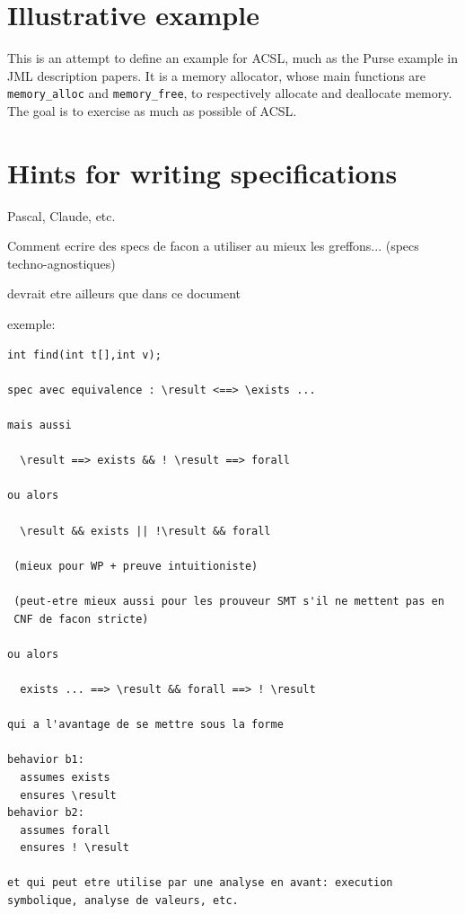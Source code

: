 \documentclass[a4paper,11pt,twoside,openright]{report}
\begin{document}






\section{Illustrative example}

This is an attempt to define an example for ACSL, much as the Purse
example in JML description papers.  It is a memory allocator, whose
main functions are \verb|memory_alloc| and \verb|memory_free|, to
respectively allocate and deallocate memory.  The goal is to exercise
as much as possible of ACSL.



\section{Hints for writing specifications}

\begin{remark}{Pascal, Claude, etc.}

Comment ecrire des specs de facon a utiliser au mieux les greffons...
(specs techno-agnostiques)
  
devrait etre ailleurs que dans ce document

exemple:

\begin{verbatim}
int find(int t[],int v);

spec avec equivalence : \result <==> \exists ...

mais aussi

  \result ==> exists && ! \result ==> forall

ou alors

  \result && exists || !\result && forall

 (mieux pour WP + preuve intuitioniste)

 (peut-etre mieux aussi pour les prouveur SMT s'il ne mettent pas en
 CNF de facon stricte)

ou alors

  exists ... ==> \result && forall ==> ! \result

qui a l'avantage de se mettre sous la forme

behavior b1:
  assumes exists
  ensures \result
behavior b2:
  assumes forall
  ensures ! \result

et qui peut etre utilise par une analyse en avant: execution
symbolique, analyse de valeurs, etc.
\end{verbatim}
\end{remark}
\end{document}

